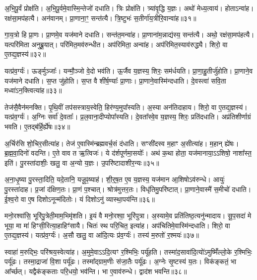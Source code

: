 अ॒भि॒पू॒र्वं प्रोक्ष॑ति। 
अ॒भि॒पू॒र्वमे॒वास्मि॒न्तेजो॑ दधाति। 
त्रिः प्रोक्ष॑ति। 
त्र्या॑वृ॒द्धि य॒ज्ञः। 
अथो॑ मेध्य॒त्वाय॑। 
होताऽन्वा॑ह। 
रक्ष॑सा॒मप॑हत्यै। 
अन॑वानम्। 
प्रा॒णाना॒ꣳ॒ सन्त॑त्यै। 
त्रि॒ष्टुभः॑ स॒तीर्गा॑य॒त्रीरि॒वान्वा॑ह॥३१॥

गा॒य॒त्रो हि प्रा॒णः। 
प्रा॒णमे॒व यज॑माने दधाति। 
सन्त॑त॒मन्वा॑ह। 
प्रा॒णाना॑म॒न्नाद्य॑स्य॒ सन्त॑त्यै। 
अथो॒ रक्ष॑सा॒मप॑हत्यै। 
यत्परि॑मिता अनुब्रू॒यात्। 
परि॑मित॒मव॑रुन्धीत। 
अप॑रिमिता॒ अन्वा॑ह। 
अप॑रिमित॒स्याव॑रुद्ध्यै। 
शिरो॒ वा ए॒तद्य॒ज्ञस्य॑॥३२॥

यत्प्र॑व॒र्ग्यः॑। 
ऊर्ङ्मुञ्जाः᳚। 
यन्मौ॒ञ्जो वे॒दो भव॑ति। 
ऊ॒र्जैव य॒ज्ञस्य॒ शिरः॒ सम॑र्धयति। 
प्रा॒णा॒हु॒तीर्जु॑होति। 
प्रा॒णाने॒व यज॑माने दधाति। 
स॒प्त जु॑होति। 
स॒प्त वै शी॑र्\mbox{}ष॒ण्याः᳚ प्रा॒णाः। 
प्रा॒णाने॒वास्मि॑न्दधाति। 
दे॒वस्त्वा॑ सवि॒ता मध्वा॑ऽन॒क्त्वित्या॑ह॥३३॥

तेज॑सै॒वैन॑मनक्ति। 
पृ॒थि॒वीं तप॑सस्त्राय॒स्वेति॒ हिर॑ण्य॒मुपा᳚\-स्यति। 
अ॒स्या अन॑तिदाहाय। 
शिरो॒ वा ए॒तद्य॒ज्ञस्य॑। 
यत्प्र॑व॒र्ग्यः॑। 
अ॒ग्निः सर्वा॑ दे॒वताः᳚। 
प्र॒ल॒वाना॒दीप्योपा᳚स्यति। 
दे॒वता᳚स्वे॒व य॒ज्ञस्य॒ शिरः॒ प्रति॑दधाति। 
अप्र॑तिशीर्णाग्रं भवति। 
ए॒तद्ब॑र्\mbox{}हि॒र्\mbox{}ह्ये॑षः॥३४॥

अ॒र्चिर॑सि शो॒चिर॒सीत्या॑ह। 
तेज॑ ए॒वास्मि॑न्ब्रह्मवर्च॒सं द॑धाति। 
सꣳसी॑दस्व म॒हाꣳ अ॒सीत्या॑ह। 
म॒हान् ह्ये॑षः। 
ब्र॒ह्म॒वा॒दिनो॑ वदन्ति। 
ए॒ते वाव त ऋ॒त्विजः॑। 
ये द॑र्\mbox{}शपूर्णमा॒सयोः᳚। 
अथ॑ क॒था होता॒ यज॑मानाया॒ऽऽशिषो॒ नाशा᳚स्त॒ इति॑। 
पु॒रस्ता॑दाशीः॒ खलु॒ वा अ॒न्यो य॒ज्ञः। 
उ॒परि॑ष्टादाशीर॒न्यः॥३५॥

अ॒ना॒धृ॒ष्या पु॒रस्ता॒दिति॒ यदे॒तानि॒ यजू॒ꣴ॒ष्याह॑। 
शी॒र्॒‌ष॒त ए॒व य॒ज्ञस्य॒ यज॑मान आ॒शिषोऽव॑रुन्धे। 
आयुः॑ पु॒रस्ता॑दाह। 
प्र॒जां द॑क्षिण॒तः। 
प्रा॒णं प॒श्चात्। 
श्रोत्र॑मुत्तर॒तः। 
विधृ॑तिमु॒परि॑ष्टात्। 
प्रा॒णाने॒वास्मै॑ स॒मीचो॑ दधाति। 
ई॒श्व॒रो वा ए॒ष दिशोऽनून्म॑दितोः। 
यं दिशोऽनु॑ व्यास्था॒पय॑न्ति॥३६॥

मनो॒रश्वा॑सि॒ भूरि॑पु॒त्रेती॒माम॒भिमृ॑शति। 
इ॒यं वै मनो॒रश्वा॒ भूरि॑पुत्रा। 
अ॒स्यामे॒व प्रति॑तिष्ठ॒त्यनु॑न्मादाय। 
सू॒प॒सदा॑ मे भूया॒ मा मा॑ हिꣳसी॒रित्या॒हाहिꣳ॑सायै। 
चितः॑ स्थ परि॒चित॒ इत्या॑ह। 
अप॑चितिमे॒वास्मि॑न्दधाति। 
शिरो॒ वा ए॒तद्य॒ज्ञस्य॑। 
यत्प्र॑व॒र्ग्यः॑। 
अ॒सौ खलु॒ वा आ॑दि॒त्यः प्र॑व॒र्ग्यः॑। 
तस्य॑ म॒रुतो॑ र॒श्मयः॑॥३७॥

स्वाहा॑ म॒रुद्भिः॒ परि॑श्रय॒स्वेत्या॑ह। 
अ॒मुमे॒वाऽऽदि॒त्यꣳ र॒श्मिभिः॒ पर्यू॑हति। 
तस्मा॑द॒सावा॑दि॒त्यो॑ऽमुष्मिँ॑ल्लो॒के र॒श्मिभिः॒ पर्यू॑ढः। 
तस्मा॒द्राजा॑ वि॒शा पर्यू॑ढः। 
तस्मा᳚द्ग्राम॒णीः स॑जा॒तैः पर्यू॑ढः। 
अ॒ग्नेः सृ॒ष्टस्य॑ य॒तः। 
विक॑ङ्कतं॒ भा आ᳚र्च्छत्। 
यद्वैक॑ङ्कताः परि॒धयो॒ भव॑न्ति। 
भा ए॒वाव॑रुन्धे। 
द्वाद॑श भवन्ति॥३८॥

